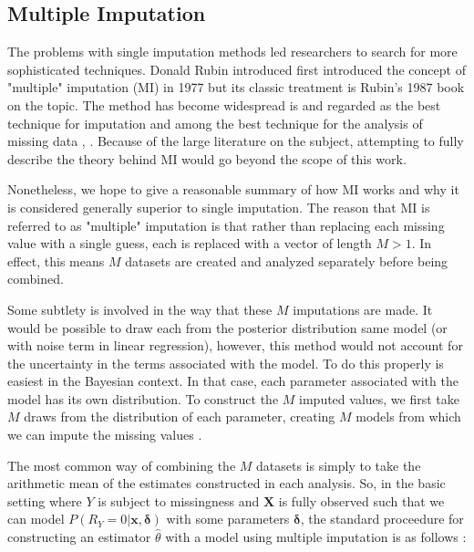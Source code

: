 \documentclass[12pt,twoside]{reedthesis}
\theoremstyle{definition}
\begin{document}
 
\subsection{Multiple Imputation}

The problems with single imputation methods led researchers to search for more sophisticated techniques. Donald Rubin introduced first introduced the concept of "multiple" imputation (MI) in 1977 \citep{Rubin_1977} but its classic treatment is Rubin's 1987 book on the topic.  The method has become widespread is and regarded as the best technique for imputation and among the best technique for the analysis of missing data \citep{Rubin_2019}, \citep{Schafer_2002}. Because of the large literature on the subject, attempting to fully describe the theory behind MI would go beyond the scope of this work. 

Nonetheless, we hope to give a reasonable summary of how MI works and why it is considered generally superior to single imputation. The reason that MI is referred to as "multiple" imputation is that rather than replacing each missing value with a single guess, each is replaced with a vector of length $M > 1$. In effect, this means $M$ datasets are created and analyzed separately before being combined. 

Some subtlety is involved in the way that these $M$ imputations are made. It would be possible to draw each from the posterior distribution same model (or with noise term in linear regression), however, this method would not account for the uncertainty in the terms associated with the model. To do this properly is easiest in the Bayesian  context. In that case, each parameter associated with the model has its own distribution. To construct the $M$ imputed values, we first take $M$ draws from the distribution of each parameter, creating $M$ models from which we can impute the missing values \citep{Gelman_1995}. 

The most common way of combining the $M$ datasets is simply to take the arithmetic mean of the estimates constructed in each analysis. So, in the basic setting where $Y$ is subject to missingness and $\mathbf{X}$ is fully observed such that we can model $P(R_Y = 0 | \mathbf{x}, \boldsymbol{\delta})$ with some parameters $\boldsymbol{\delta}$, the standard proceedure for constructing an estimator $\hat \theta$ with a model using multiple imputation is as follows :
\end{document}
